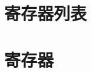 \documentclass[main\_\_CN.tex]{subfiles}
\begin{document}
\section{ 寄存器列表 }




\section{ 寄存器 }


\end{document}
